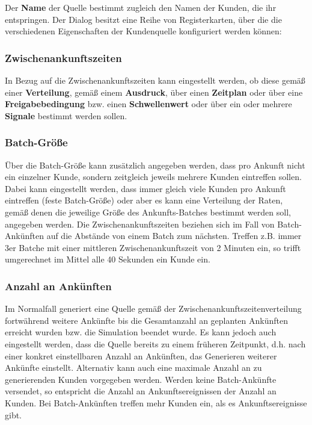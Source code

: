 Der \textbf{Name} der Quelle bestimmt zugleich den Namen der Kunden, die ihr entspringen.
Der Dialog besitzt eine Reihe von Registerkarten, über die die verschiedenen Eigenschaften
der Kundenquelle konfiguriert werden können:

\subsubsection*{Zwischenankunftszeiten}

In Bezug auf die Zwischenankunftszeiten kann eingestellt werden, ob diese gemäß einer
\textbf{Verteilung}, gemäß einem \textbf{Ausdruck}, über einen \textbf{Zeitplan} oder über eine
\textbf{Freigabebedingung} bzw. einen \textbf{Schwellenwert} oder über
ein oder mehrere \textbf{Signale} bestimmt werden sollen.

\subsubsection*{Batch-Größe}

Über die Batch-Größe kann zusätzlich
angegeben werden, dass pro Ankunft nicht ein einzelner Kunde, sondern zeitgleich jeweils
mehrere Kunden eintreffen sollen. Dabei kann eingestellt werden, dass immer gleich
viele Kunden pro Ankunft eintreffen (feste Batch-Größe) oder aber es kann eine Verteilung
der Raten, gemäß denen die jeweilige Größe des Ankunfts-Batches bestimmt werden soll,
angegeben werden.
Die Zwischenankunftszeiten beziehen sich im Fall von Batch-Ankünften auf die Abstände von
einem Batch zum nächsten. Treffen z.B. immer 3er Batche mit einer mittleren Zwischenankunftszeit
von 2 Minuten ein, so trifft umgerechnet im Mittel alle 40 Sekunden ein Kunde ein.

\subsubsection*{Anzahl an Ankünften}

Im Normalfall generiert eine Quelle gemäß der Zwischenankunftszeitenverteilung fortwährend
weitere Ankünfte bis die Gesamtanzahl an geplanten Ankünften erreicht wurden bzw. die Simulation beendet wurde.
Es kann jedoch auch eingestellt werden, dass die Quelle bereits zu einem früheren Zeitpunkt,
d.h. nach einer konkret einstellbaren Anzahl an Ankünften, das Generieren weiterer Ankünfte einstellt.
Alternativ kann auch eine maximale Anzahl an zu generierenden Kunden vorgegeben werden.
Werden keine Batch-Ankünfte versendet, so entspricht die Anzahl an Ankunftsereignissen der
Anzahl an Kunden. Bei Batch-Ankünften treffen mehr Kunden ein, als es Ankunftsereignisse gibt.

